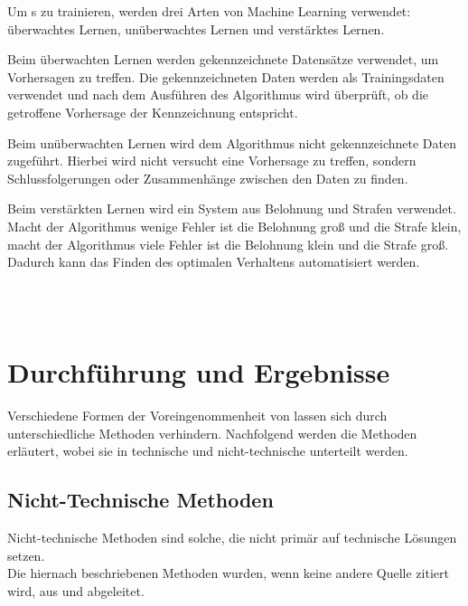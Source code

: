 \documentclass[hidelinks,12pt]{report}
\begin{document}

Um  s zu trainieren, werden drei Arten von Machine Learning verwendet: überwachtes Lernen, unüberwachtes Lernen und verstärktes Lernen. 

Beim überwachten Lernen werden gekennzeichnete Datensätze verwendet, um Vorhersagen zu treffen. Die gekennzeichneten Daten werden als Trainingsdaten verwendet und nach dem Ausführen des Algorithmus wird überprüft, ob die getroffene Vorhersage der Kennzeichnung entspricht.

Beim unüberwachten Lernen wird dem Algorithmus nicht gekennzeichnete Daten zugeführt. Hierbei wird nicht versucht eine Vorhersage zu treffen, sondern Schlussfolgerungen oder Zusammenhänge zwischen den Daten zu finden.

Beim verstärkten Lernen wird ein System aus Belohnung und Strafen verwendet. Macht der Algorithmus wenige Fehler ist die Belohnung groß und die Strafe klein, macht der Algorithmus viele Fehler ist die Belohnung klein und die Strafe groß. Dadurch kann das Finden des 
optimalen Verhaltens automatisiert werden.
\cite{serafeim}\\

\endgroup

\newpage

\begingroup
\let\clearpage\relax

\\

\\
\endgroup

\chapter{Durchführung und Ergebnisse}\label{execution}
Verschiedene Formen der Voreingenommenheit von  lassen sich durch unterschiedliche Methoden verhindern. Nachfolgend werden die Methoden erläutert, wobei sie in technische und nicht-technische unterteilt werden.

\section{Nicht-Technische Methoden}
Nicht-technische Methoden sind solche, die nicht primär auf technische Lösungen setzen.\\
Die hiernach beschriebenen Methoden wurden, wenn keine andere Quelle zitiert wird, aus \cite{UNESCO} und \cite{EUCommision} abgeleitet. %
\end{document}
